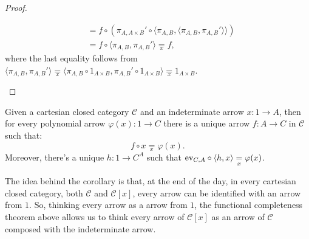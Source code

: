 \begin{proof}
\begin{itemize}
\begin{align*}
                                         &=f \circ (\pi_{A,A \times B}' \circ \langle \pi_{A,B}, \langle \pi_{A,B}, \pi_{A,B}' \rangle \rangle) \\
                                         &= f \circ \langle \pi_{A,B}, \pi_{A,B}' \rangle \underset{x}{=} f,
        \end{align*}
        where the last equality follows from $\langle \pi_{A,B}, \pi_{A,B}' \rangle \underset{x}{=} \langle \pi_{A,B} \circ 1_{A \times B}, \pi_{A,B}' \circ 1_{A \times B} \rangle \underset{x}{=} 1_{A \times B}$.
    \end{itemize}
\end{proof}

\begin{corollary}
    Given a cartesian closed category $\mathcal C$ and an indeterminate arrow $x : 1 \to A$, then for every polynomial arrow $\varphi(x) : 1 \to C$ there is a unique arrow $f : A \to C$ in $\mathcal C$ such that:
    \[ f \circ x \underset{x}{=} \varphi(x). \]
    Moreover, there's a unique $h : 1 \to C^A$ such that $\textnormal{ev}_{C,A} \circ \langle h,x \rangle \underset{x}{=} \varphi(x)$.
\end{corollary}

The idea behind the corollary is that, at the end of the day, in every cartesian closed category, both $\mathcal C$ and $\mathcal C[x]$, every arrow can be identified with an arrow from $1$.
So, thinking every arrow as a arrow from $1$, the functional completeness theorem above allows us to think every arrow of $\mathcal C[x]$ as an arrow of $\mathcal C$ composed with the indeterminate arrow.

